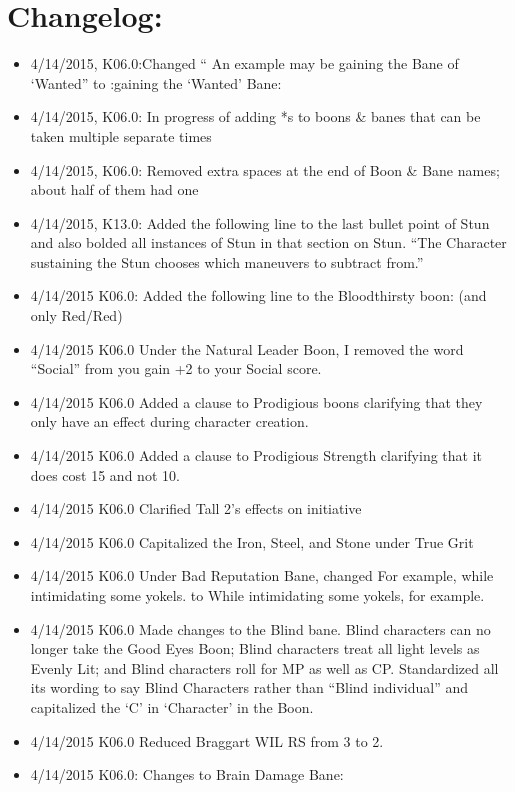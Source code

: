\documentclass[oneside,11pt,english]{book}
\begin{document}
\frontmatter
\section*{Changelog:}
{\footnotesize
	\begin{itemize}
	\setlength\itemsep{0mm}
\item 4/14/2015, K06.0:Changed “ An example may be gaining the Bane of ‘Wanted” to :gaining the ‘Wanted’ 
Bane: 
\item 4/14/2015, K06.0: In progress of adding *s to boons \& banes that can be taken multiple separate times 
\item 4/14/2015, K06.0: Removed extra spaces at the end of Boon \& Bane names; about half of them had one 
\item 4/14/2015, K13.0: Added the following line to the last bullet point of Stun and also bolded all instances of 
Stun in that section on Stun. “The Character sustaining the Stun chooses which maneuvers to subtract 
from.” 
\item 4/14/2015 K06.0: Added the following line to the Bloodthirsty boon: (and only Red/Red)
\item 4/14/2015 K06.0 Under the Natural Leader Boon, I removed the word “Social” from you gain +2 to your 
Social score. 
\item 4/14/2015 K06.0 Added a clause to Prodigious boons clarifying that they only have an effect during 
character creation. 
\item 4/14/2015 K06.0 Added a clause to Prodigious Strength clarifying that it does cost 15 and not 10. 
\item 4/14/2015 K06.0 Clarified Tall 2’s effects on initiative 
\item 4/14/2015 K06.0 Capitalized the Iron, Steel, and Stone under True Grit 
\item 4/14/2015 K06.0 Under Bad Reputation Bane, changed For example, while intimidating some yokels. to 
While intimidating some yokels, for example. 
\item 4/14/2015 K06.0 Made changes to the Blind bane. Blind characters can no longer take the Good Eyes 
Boon; Blind characters treat all light levels as Evenly Lit; and Blind characters roll for MP as well as CP. 
Standardized all its wording to say Blind Characters rather than “Blind individual” and capitalized the ‘C’ in 
‘Character’ in the Boon. 
\item 4/14/2015 K06.0 Reduced Braggart WIL RS from 3 to 2. 
\item 4/14/2015 K06.0: Changes to Brain Damage Bane: 

\end{itemize}}
\end{document}
